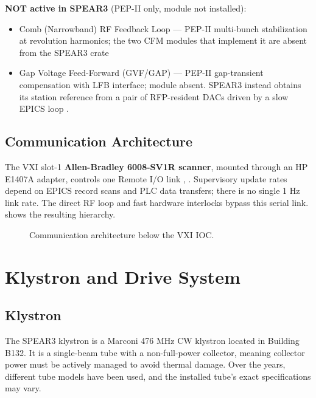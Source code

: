 \textbf{NOT active in SPEAR3} (PEP-II only, module not installed):

\begin{itemize}
\tightlist
\item
  Comb (Narrowband) RF Feedback Loop --- PEP-II multi-bunch stabilization at revolution harmonics; the two CFM modules that implement it are absent from the SPEAR3 crate
\item
  Gap Voltage Feed-Forward (GVF/GAP) --- PEP-II gap-transient compensation with LFB interface; module absent. SPEAR3 instead obtains its station reference from a pair of RFP-resident DACs driven by a slow EPICS loop . 
\end{itemize}

\subsection{Communication Architecture}\label{sec:communication}

The VXI slot-1 \textbf{Allen-Bradley 6008-SV1R scanner}, mounted through an HP E1407A adapter, controls one Remote I/O link , . Supervisory update rates depend on EPICS record scans and PLC data transfers; there is no single 1 Hz link rate. The direct RF loop and fast hardware interlocks bypass this serial link.  shows the resulting hierarchy.

\begin{figure}[tbp]\centering
\begin{fitpicture}\end{fitpicture}
\caption{Communication architecture below the VXI IOC.}\label{fig:comms-tree}
\end{figure}

\section{Klystron and Drive System}\label{sec:klystron-drive}

\subsection{Klystron}

The SPEAR3 klystron is a Marconi 476 MHz CW klystron located in Building B132. It is a single-beam tube with a non-full-power collector, meaning collector power must be actively managed to avoid thermal damage. Over the years, different tube models have been used, and the installed tube's exact specifications may vary.

